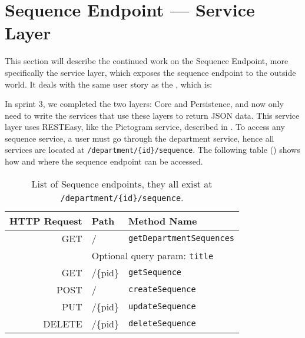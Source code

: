 \section{Sequence Endpoint --- Service Layer}
This section will describe the continued work on the Sequence Endpoint, more specifically the service layer, which exposes the sequence endpoint to the outside world.
It deals with the same user story as the , which is:
\begin{center}
\end{center}

In sprint 3, we completed the two layers: Core and Persistence, and now only need to write the services that use these layers to return JSON data.
This service layer uses RESTEasy, like the Pictogram service, described in .
To access any sequence service, a user must go through the department service, hence all services are located at \texttt{/department/\{id\}/sequence}.
The following table () shows how and where the sequence endpoint can be accessed.

\begin{table}[!htbp]
\footnotesize
\centering
\begin{tabular}{rll}
HTTP Request    & Path          & Method Name                   \\
\midrule
GET             &/              & \texttt{getDepartmentSequences}     \\
&\multicolumn{2}{l}{Optional query param: \texttt{title}}\\
GET             &/\{pid\}       & \texttt{getSequence}         \\
\tblgrpsep
POST            &/              & \texttt{createSequence}      \\
\tblgrpsep
PUT             &/\{pid\}       & \texttt{updateSequence}      \\
\tblgrpsep
DELETE          &/\{pid\}	    & \texttt{deleteSequence}	    \\
\end{tabular}
\caption{List of Sequence endpoints, they all exist at \texttt{/department/\{id\}/sequence}.}\label{tbl:sequence_eps}
\end{table}

